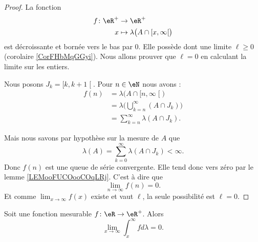 \begin{proof}
    La fonction
    \begin{equation}
        \begin{aligned}
            f\colon \eR^+&\to \eR^+ \\
            x&\mapsto \lambda\big( A\cap\mathopen[ x , \infty \mathclose[ \big)
        \end{aligned}
    \end{equation}
    est décroissante et bornée vers le bas par \( 0\). Elle possède dont une limite \( \ell\geq 0\) (corolaire \ref{CorFHbMqGGyi}). Nous allons prouver que \( \ell=0\) en calculant la limite sur les entiers.

    Nous posons \( J_k=\mathopen[ k , k+1 \mathclose[\). Pour \( n\in \eN\) nous avons :
    \begin{subequations}
        \begin{align}
            f(n)&=\lambda\big( A\cap\mathopen[ n , \infty \mathclose[ \big)\\
                &=\lambda\big( \bigcup_{k=n}^{\infty}(A\cap J_k) \big)\\
                &=\sum_{k=n}^{\infty}\lambda(A\cap J_k).
        \end{align}
    \end{subequations}
    
    Mais nous savons par hypothèse sur la mesure de \( A\) que
    \begin{equation}
        \lambda(A)=\sum_{k=0}^{\infty}\lambda(A\cap J_k)<\infty.
    \end{equation}
    Donc \( f(n)\) est une queue de série convergente. Elle tend donc vers zéro par le lemme \ref{LEMooFUCOooCOqLRj}. C'est à dire que
    \begin{equation}
        \lim_{n\to \infty} f(n)=0.
    \end{equation}
    Et comme \( \lim_{x\to \infty}f(x) \) existe et vaut \( \ell\), la seule possibilité est \( \ell=0\).
\end{proof}

\begin{lemma}       \label{LEMooMUHWooZPbMDb}
    Soit une fonction mesurable \( f\colon \eR\to \eR^+\). Alors
    \begin{equation}
        \lim_{x\to \infty} \int_x^{\infty}fd\lambda=0.
    \end{equation}
\end{lemma}

